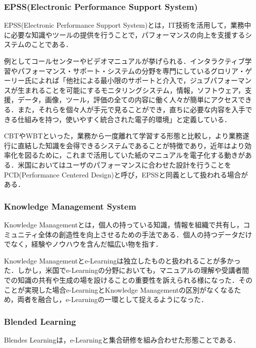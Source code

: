 \documentclass[a4j,12pt]{jsarticle}
\begin{document}
\subsubsection{EPSS(Electronic Performance Support System)}
EPSS(Electronic Performance Support System)とは，IT技術を活用して，業務中に必要な知識やツールの提供を行うことで，パフォーマンスの向上を支援するシステムのことである．

例としてコールセンターやビデオマニュアルが挙げられる．インタラクティブ学習やパフォーマンス・サポート・システムの分野を専門にしているグロリア・ゲーリー氏によれば「他社による最小限のサポートと介入で，ジュブパフォーマンスが生まれることを可能にするモニタリングシステム，情報，ソフトウェア，支援，データ，画像，ツール，評価の全ての内容に働く人々が簡単にアクセスできる．また，それらを個々人が手元で見ることができ，直ちに必要な内容を入手できる仕組みを持つ，使いやすく統合された電子的環境」と定義している．

CBTやWBTといった，業務から一度離れて学習する形態と比較し，より業務遂行に直結した知識を会得できるシステムであることが特徴であり，近年はより効率化を図るために，これまで活用していた紙のマニュアルを電子化する動きがある．米国においてはユーザのパフォーマンスに合わせた設計を行うことをPCD(Performance Centered Design)と呼び，EPSSと同義として扱われる場合がある．
\subsubsection{Knowledge Management System}
Knowledge Managementとは，個人の持っている知識，情報を組織で共有し，コミュニティ全体の創造性を向上させるための手法である．個人の持つデータだけでなく，経験やノウハウを含んだ幅広い物を指す．

Knowledge Managementとe-Learningは独立したものと扱われることが多かった．しかし，米国でe-Learningの分野においても，マニュアルの理解や受講者間での知識の共有や生成の場を設けることの重要性を訴えられる様になった．そのことが実現した場合e-LearningとKnowledge Managementの区別がなくなるため，両者を融合し，e-Learningの一環として捉えるようになった．

\subsubsection{Blended Learning}
Blendes Learningは，e-Learningと集合研修を組み合わせた形態ことである．
\end{document}
